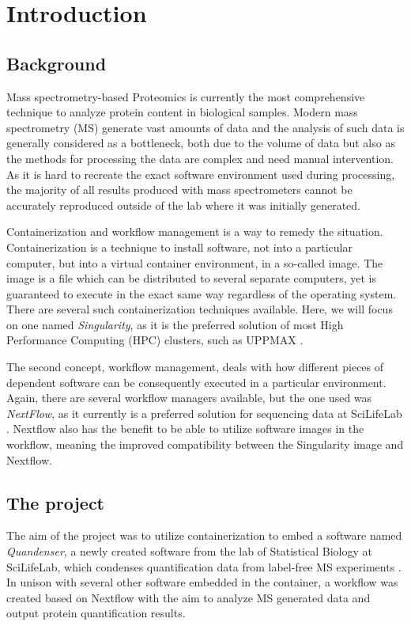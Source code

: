 \section{Introduction}

\subsection{Background}
Mass spectrometry-based Proteomics is currently the most comprehensive technique to analyze protein content in biological samples. Modern mass spectrometry (MS) generate vast amounts of data and the analysis of such data is generally considered as a bottleneck, both due to the volume of data but also as the methods for processing the data are complex and need manual intervention. As it is hard to recreate the exact software environment used during processing, the majority of all results produced with mass spectrometers cannot be accurately reproduced outside of the lab where it was initially generated.

Containerization and workflow management is a way to remedy the situation. Containerization is a technique to install software, not into a particular computer, but into a virtual container environment, in a so-called image. The image is a file which can be distributed to several separate computers, yet is guaranteed to execute in the exact same way regardless of the operating system. There are several such containerization techniques available. Here, we will focus on one named \textit{Singularity}, as it is the preferred solution of most High Performance Computing (HPC) clusters, such as UPPMAX \cite{singularity} \cite{singularity-uppmax}.

The second concept, workflow management, deals with how different pieces of dependent software can be consequently executed in a particular environment. Again, there are several workflow managers available, but the one used was \textit{NextFlow}, as it currently is a preferred solution for sequencing data at SciLifeLab \cite{nextflow}. Nextflow also has the benefit to be able to utilize software images in the workflow, meaning the improved compatibility between the Singularity image and Nextflow.

\subsection{The project}
The aim of the project was to utilize containerization to embed a software named \textit{Quandenser}, a newly created software from the lab of Statistical Biology at SciLifeLab, which condenses quantification data from label-free MS experiments \cite{quandenser}. In unison with several other software embedded in the container, a workflow was created based on Nextflow with the aim to analyze MS generated data and output protein quantification results.

